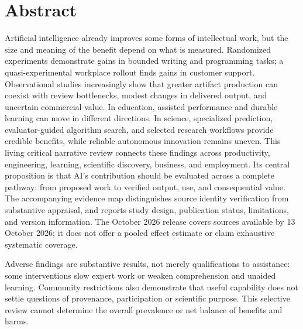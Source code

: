 \section*{Abstract}
Artificial intelligence already improves some forms of intellectual work, but the size and meaning of the benefit depend on what is measured. Randomized experiments demonstrate gains in bounded writing and programming tasks; a quasi-experimental workplace rollout finds gains in customer support. Observational studies increasingly show that greater artifact production can coexist with review bottlenecks, modest changes in delivered output, and uncertain commercial value. In education, assisted performance and durable learning can move in different directions. In science, specialized prediction, evaluator-guided algorithm search, and selected research workflows provide credible benefits, while reliable autonomous innovation remains uneven. This living critical narrative review connects these findings across productivity, engineering, learning, scientific discovery, business, and employment. Its central proposition is that AI's contribution should be evaluated across a complete pathway: from proposed work to verified output, use, and consequential value. The accompanying evidence map distinguishes source identity verification from substantive appraisal, and reports study design, publication status, limitations, and version information. The October 2026 release covers sources available by 13 October 2026; it does not offer a pooled effect estimate or claim exhaustive systematic coverage.


Adverse findings are substantive results, not merely qualifications to assistance: some interventions slow expert work or weaken comprehension and unaided learning. Community restrictions also demonstrate that useful capability does not settle questions of provenance, participation or scientific purpose. This selective review cannot determine the overall prevalence or net balance of benefits and harms.


